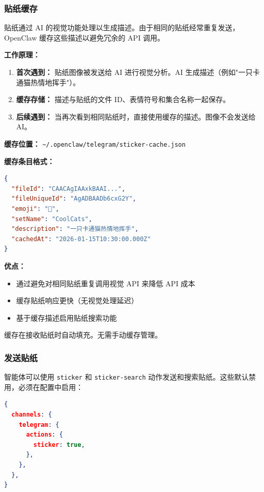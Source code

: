 \subsubsection{贴纸缓存}


贴纸通过 AI 的视觉功能处理以生成描述。由于相同的贴纸经常重复发送，OpenClaw 缓存这些描述以避免冗余的 API 调用。

\textbf{工作原理：}

\begin{enumerate}
  \item \textbf{首次遇到：} 贴纸图像被发送给 AI 进行视觉分析。AI 生成描述（例如"一只卡通猫热情地挥手"）。
  \item \textbf{缓存存储：} 描述与贴纸的文件 ID、表情符号和集合名称一起保存。
  \item \textbf{后续遇到：} 当再次看到相同贴纸时，直接使用缓存的描述。图像不会发送给 AI。
\end{enumerate}


\textbf{缓存位置：} \texttt{\textasciitilde{}/.openclaw/telegram/sticker-cache.json}

\textbf{缓存条目格式：}

\begin{lstlisting}[language=json]
{
  "fileId": "CAACAgIAAxkBAAI...",
  "fileUniqueId": "AgADBAADb6cxG2Y",
  "emoji": "👋",
  "setName": "CoolCats",
  "description": "一只卡通猫热情地挥手",
  "cachedAt": "2026-01-15T10:30:00.000Z"
}
\end{lstlisting}


\textbf{优点：}

\begin{itemize}
  \item 通过避免对相同贴纸重复调用视觉 API 来降低 API 成本
  \item 缓存贴纸响应更快（无视觉处理延迟）
  \item 基于缓存描述启用贴纸搜索功能
\end{itemize}


缓存在接收贴纸时自动填充。无需手动缓存管理。

\subsubsection{发送贴纸}


智能体可以使用 \texttt{sticker} 和 \texttt{sticker-search} 动作发送和搜索贴纸。这些默认禁用，必须在配置中启用：

\begin{lstlisting}[language=json]
{
  channels: {
    telegram: {
      actions: {
        sticker: true,
      },
    },
  },
}
\end{lstlisting}


